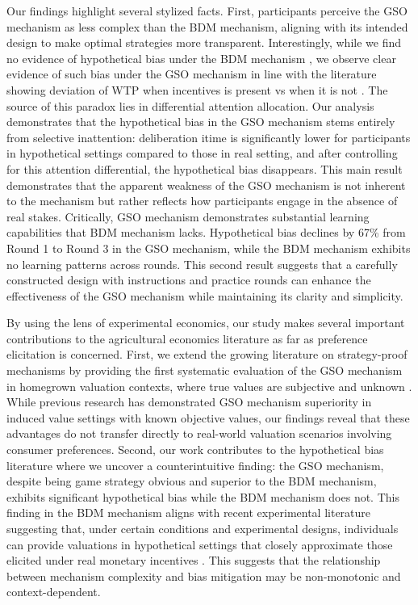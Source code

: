 \documentclass[12pt]{article}
\begin{document}
Our findings highlight several stylized facts. First, participants perceive the GSO mechanism as less complex than the BDM mechanism, aligning with its intended design to make optimal strategies more transparent. Interestingly, while we find no evidence of hypothetical bias under the BDM mechanism \citep{branas-garza_paid_2023, drichoutis_incentives_2025}, we observe clear evidence of such bias under the GSO mechanism in line with the literature showing deviation of WTP when incentives is present vs when it is not \citep{loomis_whats_2011, penn2018understanding}. 
The source of this paradox lies in differential attention allocation. Our analysis demonstrates that the hypothetical bias in the GSO mechanism stems entirely from selective inattention: deliberation itime is significantly lower for participants in hypothetical settings compared to those in real setting, and after controlling for this attention differential, the hypothetical bias disappears. This main result demonstrates that the apparent weakness of the GSO mechanism  is not inherent to the mechanism but rather reflects how participants engage in the absence of real stakes. Critically, GSO mechanism demonstrates substantial learning capabilities that BDM mechanism lacks. Hypothetical bias declines by 67\% from Round 1 to Round 3 in the GSO mechanism, while the BDM mechanism exhibits no learning patterns across rounds. This second result suggests that a carefully constructed design with instructions and practice rounds can enhance the effectiveness of the GSO mechanism while maintaining its clarity and simplicity.


By using the lens of experimental economics, our study makes several important contributions to the  agricultural economics literature as far as preference elicitation is concerned. First, we extend the growing literature on strategy-proof mechanisms by providing the first systematic evaluation of the GSO mechanism in homegrown valuation contexts, where true values are subjective and unknown \citep{li_obviously_2017, pycia_theory_2023, chakraborty_future_2025}. While previous research has demonstrated GSO mechanism superiority in induced value settings with known objective values, our findings reveal that these advantages do not transfer directly to real-world valuation scenarios involving consumer preferences. Second, our work contributes to the hypothetical bias literature \citep{penn2018understanding, cummings1999unbiased, loomis_whats_2011, fang_use_2021, list2001explicit, grebitus2013explaining} where we uncover a counterintuitive finding: the GSO mechanism, despite being game strategy obvious and superior to the BDM mechanism, exhibits significant hypothetical bias while the BDM mechanism does not. This finding in the BDM mechanism aligns with recent experimental literature suggesting that, under certain conditions and experimental designs, individuals can provide valuations in hypothetical settings that closely approximate those elicited under real monetary incentives \citep{branas-garza_paid_2023, drichoutis_incentives_2025, hackethal2023role}. This suggests that the relationship between mechanism complexity and bias mitigation may be non-monotonic and context-dependent.
\end{document}
